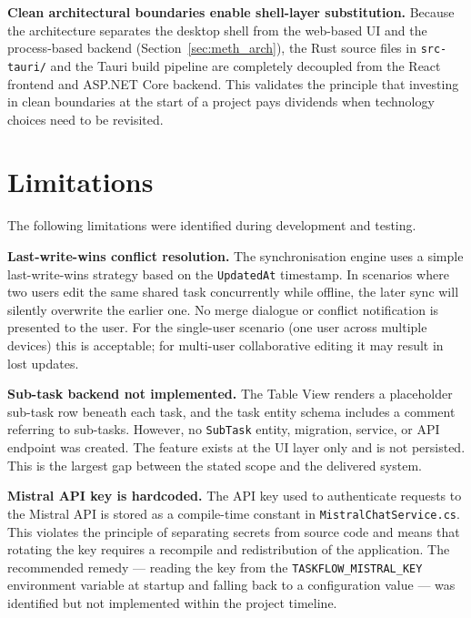 \textbf{Clean architectural boundaries enable shell-layer substitution.}
Because the architecture separates the desktop shell from the web-based UI
and the process-based backend (Section~\ref{sec:meth_arch}), the Rust source
files in \texttt{src-tauri/} and the Tauri build pipeline are completely
decoupled from the React frontend and ASP.NET Core backend.
This validates the principle that investing in clean boundaries at the start of
a project pays dividends when technology choices need to be revisited.

\section{Limitations}\label{sec:concl_limitations}

The following limitations were identified during development and testing.

\textbf{Last-write-wins conflict resolution.}
The synchronisation engine uses a simple last-write-wins strategy based on the
\texttt{UpdatedAt} timestamp.
In scenarios where two users edit the same shared task concurrently while offline, the
later sync will silently overwrite the earlier one.
No merge dialogue or conflict notification is presented to the user.
For the single-user scenario (one user across multiple devices) this is acceptable;
for multi-user collaborative editing it may result in lost updates.

\textbf{Sub-task backend not implemented.}
The Table View renders a placeholder sub-task row beneath each task, and the task
entity schema includes a comment referring to sub-tasks.
However, no \texttt{SubTask} entity, migration, service, or API endpoint was created.
The feature exists at the UI layer only and is not persisted.
This is the largest gap between the stated scope and the delivered system.

\textbf{Mistral API key is hardcoded.}
The API key used to authenticate requests to the Mistral API is stored as a
compile-time constant in \texttt{MistralChatService.cs}.
This violates the principle of separating secrets from source code and means that
rotating the key requires a recompile and redistribution of the application.
The recommended remedy --- reading the key from the \texttt{TASKFLOW\_MISTRAL\_KEY}
environment variable at startup and falling back to a configuration value --- was
identified but not implemented within the project timeline.


